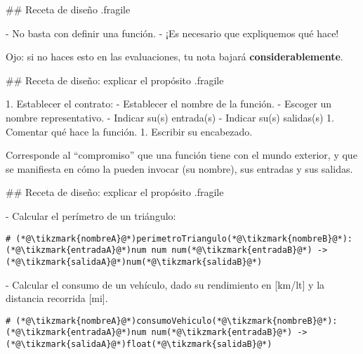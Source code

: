 ## Receta de diseño {.fragile}

- No basta con definir una función.
- ¡Es necesario que expliquemos qué hace!

\muestraRecetaDisenno{}


\pause

\bgnblockdanger
Ojo: si no haces esto en las evaluaciones, tu nota bajará \textbf{considerablemente}.
\trmblockdanger

## Receta de diseño: explicar el propósito {.fragile}


1. Establecer el contrato:
    - Establecer el nombre de la función.
        - Escoger un nombre representativo.
    - Indicar su(s) entrada(s)
    - Indicar su(s) salidas(s)
1. Comentar qué hace la función.
1. Escribir su encabezado.

\vfill

\bgnblockdefinition
{} Corresponde al ``compromiso'' que una función tiene con el mundo exterior,
y que se manifiesta en cómo la pueden invocar (su nombre), sus entradas y sus salidas.
\trmblockdefinition

## Receta de diseño: explicar el propósito {.fragile}


- Calcular el perímetro de un triángulo:

\vspace{-.5em}
\begin{lstlisting}[basicstyle=\normalsize\ttfamily]
# (*@\tikzmark{nombreA}@*)perimetroTriangulo(*@\tikzmark{nombreB}@*): (*@\tikzmark{entradaA}@*)num num num(*@\tikzmark{entradaB}@*) -> (*@\tikzmark{salidaA}@*)num(*@\tikzmark{salidaB}@*)
\end{lstlisting}


\vspace{3em}

- Calcular el consumo de un vehículo, dado su rendimiento en [km/lt] y
la distancia recorrida [mi].

\vspace{-.5em}
\begin{lstlisting}[basicstyle=\normalsize\ttfamily]
# (*@\tikzmark{nombreA}@*)consumoVehiculo(*@\tikzmark{nombreB}@*): (*@\tikzmark{entradaA}@*)num num(*@\tikzmark{entradaB}@*) -> (*@\tikzmark{salidaA}@*)float(*@\tikzmark{salidaB}@*)
\end{lstlisting}

